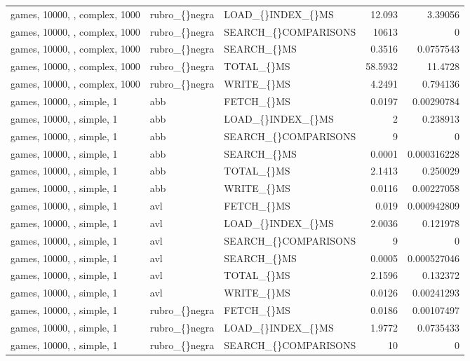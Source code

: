 \begin{longtable}{p{4cm}p{1.4cm}p{2.6cm}rr}
games, 10000, , complex, 1000 & rubro\_\allowbreak\{\}negra & LOAD\_\allowbreak\{\}INDEX\_\allowbreak\{\}MS & 12.093 & 3.39056\\
games, 10000, , complex, 1000 & rubro\_\allowbreak\{\}negra & SEARCH\_\allowbreak\{\}COMPARISONS & 10613 & 0\\
games, 10000, , complex, 1000 & rubro\_\allowbreak\{\}negra & SEARCH\_\allowbreak\{\}MS & 0.3516 & 0.0757543\\
games, 10000, , complex, 1000 & rubro\_\allowbreak\{\}negra & TOTAL\_\allowbreak\{\}MS & 58.5932 & 11.4728\\
games, 10000, , complex, 1000 & rubro\_\allowbreak\{\}negra & WRITE\_\allowbreak\{\}MS & 4.2491 & 0.794136\\
games, 10000, , simple, 1 & abb & FETCH\_\allowbreak\{\}MS & 0.0197 & 0.00290784\\
games, 10000, , simple, 1 & abb & LOAD\_\allowbreak\{\}INDEX\_\allowbreak\{\}MS & 2 & 0.238913\\
games, 10000, , simple, 1 & abb & SEARCH\_\allowbreak\{\}COMPARISONS & 9 & 0\\
games, 10000, , simple, 1 & abb & SEARCH\_\allowbreak\{\}MS & 0.0001 & 0.000316228\\
games, 10000, , simple, 1 & abb & TOTAL\_\allowbreak\{\}MS & 2.1413 & 0.250029\\
games, 10000, , simple, 1 & abb & WRITE\_\allowbreak\{\}MS & 0.0116 & 0.00227058\\
games, 10000, , simple, 1 & avl & FETCH\_\allowbreak\{\}MS & 0.019 & 0.000942809\\
games, 10000, , simple, 1 & avl & LOAD\_\allowbreak\{\}INDEX\_\allowbreak\{\}MS & 2.0036 & 0.121978\\
games, 10000, , simple, 1 & avl & SEARCH\_\allowbreak\{\}COMPARISONS & 9 & 0\\
games, 10000, , simple, 1 & avl & SEARCH\_\allowbreak\{\}MS & 0.0005 & 0.000527046\\
games, 10000, , simple, 1 & avl & TOTAL\_\allowbreak\{\}MS & 2.1596 & 0.132372\\
games, 10000, , simple, 1 & avl & WRITE\_\allowbreak\{\}MS & 0.0126 & 0.00241293\\
games, 10000, , simple, 1 & rubro\_\allowbreak\{\}negra & FETCH\_\allowbreak\{\}MS & 0.0186 & 0.00107497\\
games, 10000, , simple, 1 & rubro\_\allowbreak\{\}negra & LOAD\_\allowbreak\{\}INDEX\_\allowbreak\{\}MS & 1.9772 & 0.0735433\\
games, 10000, , simple, 1 & rubro\_\allowbreak\{\}negra & SEARCH\_\allowbreak\{\}COMPARISONS & 10 & 0\\

\end{longtable}

